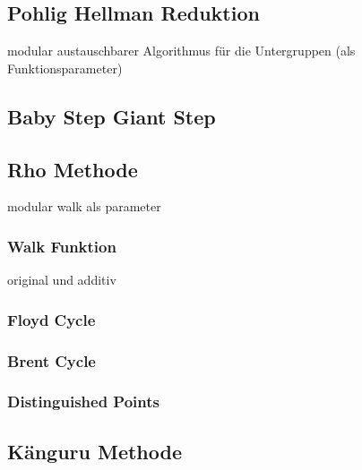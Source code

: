 \documentclass{scrartcl}
\begin{document}
\subsection{Pohlig Hellman Reduktion}
\label{sec:pohlig_hellman}

modular austauschbarer Algorithmus für die Untergruppen
(als Funktionsparameter)

\cite{Pohlig1978}

\subsection{Baby Step Giant Step}
\label{sec:baby_step_giant_step}

\cite{Galbraith2012}

\subsection{Rho Methode}
\label{sec:rho}

modular walk als parameter

\cite{Galbraith2012}

\subsubsection{Walk Funktion}
\label{sec:walk_funktion}
original und additiv

\subsubsection{Floyd Cycle}
\label{sec:floyd_cycle}


\subsubsection{Brent Cycle}
\label{sec:brent_cycle}

\cite{Brent1980}

\subsubsection{Distinguished Points}
\label{sec:distinguished_points}


\cite{VanOorschot1999}

\subsection{Känguru Methode}
\label{sec:kaenguru}
\end{document}
